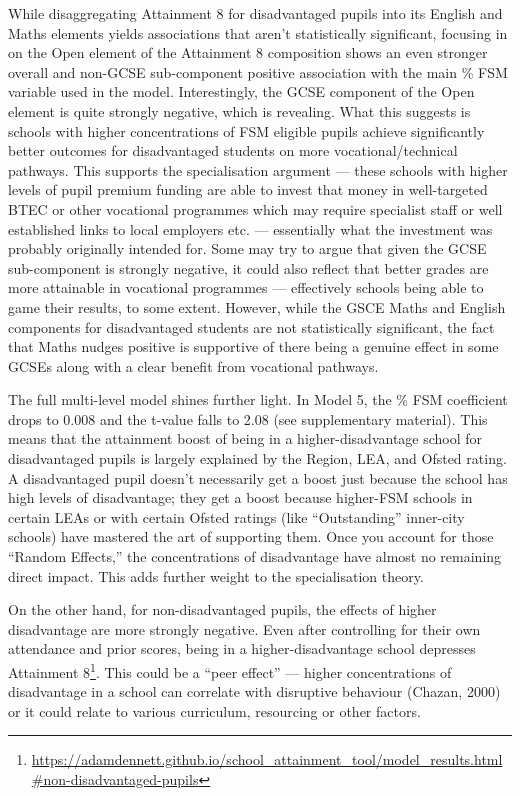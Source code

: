 \documentclass[
  11pt,
]{article}
\begin{document}
While disaggregating Attainment 8 for disadvantaged pupils into its
English and Maths elements yields associations that aren't statistically
significant, focusing in on the Open element of the Attainment 8
composition shows an even stronger overall and non-GCSE sub-component
positive association with the main \% FSM variable used in the model.
Interestingly, the GCSE component of the Open element is quite strongly
negative, which is revealing. What this suggests is schools with higher
concentrations of FSM eligible pupils achieve significantly better
outcomes for disadvantaged students on more vocational/technical
pathways. This supports the specialisation argument --- these schools
with higher levels of pupil premium funding are able to invest that
money in well-targeted BTEC or other vocational programmes which may
require specialist staff or well established links to local employers
etc. --- essentially what the investment was probably originally
intended for. Some may try to argue that given the GCSE sub-component is
strongly negative, it could also reflect that better grades are more
attainable in vocational programmes --- effectively schools being able
to game their results, to some extent. However, while the GSCE Maths and
English components for disadvantaged students are not statistically
significant, the fact that Maths nudges positive is supportive of there
being a genuine effect in some GCSEs along with a clear benefit from
vocational pathways.

The full multi-level model shines further light. In Model 5, the \% FSM
coefficient drops to 0.008 and the t-value falls to 2.08 (see
supplementary material). This means that the attainment boost of being
in a higher-disadvantage school for disadvantaged pupils is largely
explained by the Region, LEA, and Ofsted rating. A disadvantaged pupil
doesn't necessarily get a boost just because the school has high levels
of disadvantage; they get a boost because higher-FSM schools in certain
LEAs or with certain Ofsted ratings (like ``Outstanding'' inner-city
schools) have mastered the art of supporting them. Once you account for
those ``Random Effects,'' the concentrations of disadvantage have almost
no remaining direct impact. This adds further weight to the
specialisation theory.

On the other hand, for non-disadvantaged pupils, the effects of higher
disadvantage are more strongly negative. Even after controlling for
their own attendance and prior scores, being in a higher-disadvantage
school depresses Attainment 8\footnote{\url{https://adamdennett.github.io/school_attainment_tool/model_results.html\#non-disadvantaged-pupils}}.
This could be a ``peer effect'' --- higher concentrations of
disadvantage in a school can correlate with disruptive behaviour
(Chazan, 2000) or it could relate to various curriculum, resourcing or
other factors.
\end{document}
